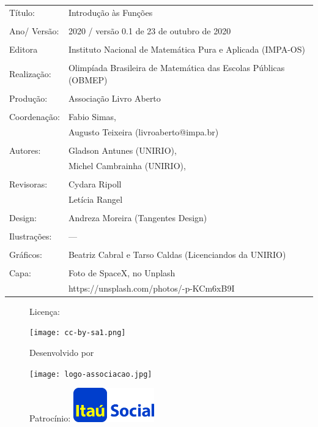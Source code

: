 \begin{tabular}{p{}p{}}
Título: & Introdução às Funções\\
\\
Ano/ Versão: & 2020 / versão 0.1 de 23 de outubro de 2020\\
\\
Editora & Instituto Nacional de Matem\'atica Pura e Aplicada (IMPA-OS)\\
\\
Realização:& Olimp\'iada Brasileira de Matem\'atica das Escolas P\'ublicas (OBMEP)\\
\\
Produção:& Associação Livro Aberto\\
\\
Coordenação:& Fabio Simas, \\
			& Augusto Teixeira (livroaberto@impa.br)\\
\\
  Autores: & Gladson Antunes (UNIRIO),\\
        & Michel Cambrainha (UNIRIO),\\
           
\\
Revisoras: &  Cydara Ripoll  \\
                &  Letícia Rangel \\
\\
Design: & Andreza Moreira (Tangentes Design) \\
\\
  Ilustrações: & --- \\ 
\\
Gráficos: & Beatriz Cabral e Tarso Caldas (Licenciandos da UNIRIO)\\
\\
  Capa: & Foto de SpaceX, no Unplash \\
  		& https://unsplash.com/photos/-p-KCm6xB9I
\end{tabular}
\vspace{.5cm}


\begin{figure}[b]
\begin{minipage}[l]{5cm}
\centering

{\large Licença:}

  \texttt{[image: cc-by-sa1.png]}
\end{minipage}\hfill
\begin{minipage}[c]{5cm}
\centering
{\large Desenvolvido por}

\texttt{[image: logo-associacao.jpg]}
\end{minipage}
\begin{minipage}[r]{5cm}
\centering

{\large Patrocínio:}
  \vspace{1em}
  \includegraphics[width=3.5cm]{itau}
\end{minipage}
\end{figure}

